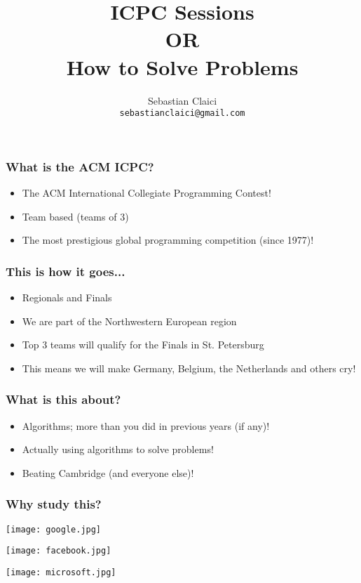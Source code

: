\documentclass[svgnames,dvipsnames,usenames]{beamer}
\title{ICPC Sessions \\
    OR \\
    How to Solve Problems
}
\author{Sebastian Claici \\
    \texttt{sebastianclaici@gmail.com}
}
\begin{document}
\maketitle

\begin{frame}
    \frametitle{What is the ACM ICPC?}
    \begin{itemize}
            \pause
        \item The ACM International Collegiate Programming Contest!
            \pause
        \item Team based (teams of 3)
            \pause
        \item The most prestigious global programming competition (since 1977)!
    \end{itemize}
\end{frame}

\begin{frame}
    \frametitle{This is how it goes...}
    \begin{itemize}
            \pause
        \item Regionals and Finals
            \pause
        \item We are part of the Northwestern European region
            \pause
	\item Top 3 teams will qualify for the Finals in St. Petersburg
            \pause
        \item This means we will make Germany, Belgium, the Netherlands and others cry!
    \end{itemize}
\end{frame}

\begin{frame}
    \frametitle{What is this about?}
    \begin{itemize}
            \pause
        \item Algorithms; more than you did in previous years (if any)!
            \pause
        \item Actually using algorithms to solve problems!
            \pause
        \item Beating Cambridge (and everyone else)!
    \end{itemize}
\end{frame}

\begin{frame}
    \frametitle{Why study this?}
    \begin{flushleft}
        \pause
        \texttt{[image: google.jpg]}
    \end{flushleft}
    \begin{flushright}
        \pause
        \texttt{[image: facebook.jpg]}
    \end{flushright}
    \begin{flushleft}
        \pause
        \texttt{[image: microsoft.jpg]}
    \end{flushleft}
\end{frame}
\end{document}
